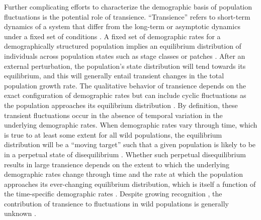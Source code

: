\documentclass[11pt]{article}
\begin{document}
Further complicating efforts to characterize the demographic basis 
of population fluctuations is the potential role of transience.
``Transience'' refers to short-term dynamics of a system 
that differ from the long-term or asymptotic dynamics under a fixed set of conditions
\citep{hastings2010}.
A fixed set of demographic rates for a demographically structured population 
implies an equilibrium distribution
of individuals across population states such as stage classes or patches
\citep{caswell2001matrix}.
After an external perturbation, 
the population's state distribution will tend towards its equilibrium,
and this will generally entail transient changes 
in the total population growth rate.
The qualitative behavior of transience depends
on the exact configuration of demographic rates
but can include cyclic fluctuations 
as the population approaches its equilibrium distribution
\citep{caswell2001matrix}.
By definition, these transient fluctuations occur in the absence 
of temporal variation in the underlying demographic rates.
When demographic rates vary through time,
which is true to at least some extent for all wild populations,
the equilibrium distribution will be a ``moving target''
such that a given population is likely to be in a perpetual state of disequilibrium
\citep{fox2000population, koons2017understanding}.
Whether such perpetual disequilibrium results in large transience 
depends on the extent to which the underlying demographic rates change through time
and the rate at which the population approaches its ever-changing equilibrium distribution,
which is itself a function of the time-specific demographic rates
\citep{caswell2005reactivity, caswell2007sensitivity}.
Despite growing recognition
\citep{caswell2007sensitivity, koons2017understanding},
the contribution of transience to fluctuations in wild populations is generally unknown
\citep[but see][]{hoy2020fluctuations}.
\end{document}
